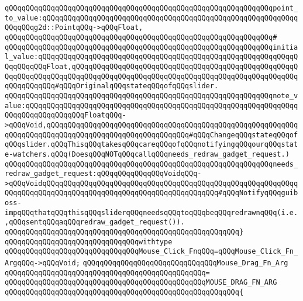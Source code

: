 \verb|qQQqqQQqqQQqqQQqqQQqqQQqqQQqqQQqqQQqqQQqqQQqqQQqqQQqqQQqqQQqqQQqpoint_to_value:qQQqqQQqqQQqqQQqqQQqqQQqqQQqqQQqqQQqqQQqqQQqqQQqqQQqqQQqqQQqqQQqqQQqg2d::PointqQQq->qQQqFloat,|\newline
\verb|qQQqqQQqqQQqqQQqqQQqqQQqqQQqqQQqqQQqqQQqqQQqqQQqqQQqqQQqqQQqqQQq#|\newline
\verb|qQQqqQQqqQQqqQQqqQQqqQQqqQQqqQQqqQQqqQQqqQQqqQQqqQQqqQQqqQQqqQQqinitial_value:qQQqqQQqqQQqqQQqqQQqqQQqqQQqqQQqqQQqqQQqqQQqqQQqqQQqqQQqqQQqqQQqqQQqqQQqFloat,qQQqqQQqqQQqqQQqqQQqqQQqqQQqqQQqqQQqqQQqqQQqqQQqqQQqqQQqqQQqqQQqqQQqqQQqqQQqqQQqqQQqqQQqqQQqqQQqqQQqqQQqqQQqqQQqqQQqqQQqqQQqqQQqqQQqqQQq#qQQqOriginalqQQqstateqQQqofqQQqslider.|\newline
\verb|qQQqqQQqqQQqqQQqqQQqqQQqqQQqqQQqqQQqqQQqqQQqqQQqqQQqqQQqqQQqqQQqnote_value:qQQqqQQqqQQqqQQqqQQqqQQqqQQqqQQqqQQqqQQqqQQqqQQqqQQqqQQqqQQqqQQqqQQqqQQqqQQqqQQqqQQqFloatqQQq->qQQqVoid,qQQqqQQqqQQqqQQqqQQqqQQqqQQqqQQqqQQqqQQqqQQqqQQqqQQqqQQqqQQqqQQqqQQqqQQqqQQqqQQqqQQqqQQqqQQqqQQqqQQqqQQq#qQQqChangeqQQqstateqQQqofqQQqslider.qQQqThisqQQqtakesqQQqcareqQQqofqQQqnotifyingqQQqourqQQqstate-watchers.qQQq(DoesqQQqNOTqQQqcallqQQqneeds_redraw_gadget_request.)|\newline
\verb|qQQqqQQqqQQqqQQqqQQqqQQqqQQqqQQqqQQqqQQqqQQqqQQqqQQqqQQqqQQqqQQqneeds_redraw_gadget_request:qQQqqQQqqQQqqQQqVoidqQQq->qQQqVoidqQQqqQQqqQQqqQQqqQQqqQQqqQQqqQQqqQQqqQQqqQQqqQQqqQQqqQQqqQQqqQQqqQQqqQQqqQQqqQQqqQQqqQQqqQQqqQQqqQQqqQQqqQQqqQQq#qQQqNotifyqQQqguiboss-impqQQqthatqQQqthisqQQqsliderqQQqneedsqQQqtoqQQqbeqQQqredrawnqQQq(i.e.,qQQqsentqQQqaqQQqredraw_gadget_request()).|\newline
\verb|qQQqqQQqqQQqqQQqqQQqqQQqqQQqqQQqqQQqqQQqqQQqqQQqqQQqqQQq}|\newline
\verb|qQQqqQQqqQQqqQQqqQQqqQQqqQQqqQQqwithtype|\newline
\verb|qQQqqQQqqQQqqQQqqQQqqQQqqQQqqQQqMouse_Click_FnqQQq=qQQqMouse_Click_Fn_ArgqQQq->qQQqVoid;|\newline
\newline
\newline
\newline
\verb|qQQqqQQqqQQqqQQqqQQqqQQqqQQqqQQqMouse_Drag_Fn_Arg|\newline
\verb|qQQqqQQqqQQqqQQqqQQqqQQqqQQqqQQqqQQqqQQqqQQqqQQq=|\newline
\verb|qQQqqQQqqQQqqQQqqQQqqQQqqQQqqQQqqQQqqQQqqQQqqQQqMOUSE_DRAG_FN_ARG|\newline
\verb|qQQqqQQqqQQqqQQqqQQqqQQqqQQqqQQqqQQqqQQqqQQqqQQqqQQqqQQq{|\newline
